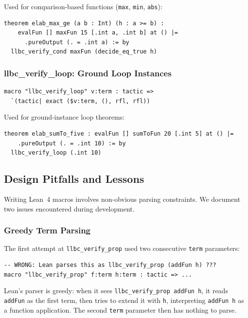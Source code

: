 Used for comparison-based functions (\texttt{max}, \texttt{min}, \texttt{abs}):

\begin{lstlisting}
theorem elab_max_ge (a b : Int) (h : a >= b) :
    evalFun [] maxFun 15 [.int a, .int b] at () |=
      .pureOutput (. = .int a) := by
  llbc_verify_cond maxFun (decide_eq_true h)
\end{lstlisting}

\subsubsection{llbc\_verify\_loop: Ground Loop Instances}

\begin{lstlisting}[caption={llbc\_verify\_loop macro.},label={lst:lvl}]
macro "llbc_verify_loop" v:term : tactic =>
  `(tactic| exact ($v:term, (), rfl, rfl))
\end{lstlisting}

Used for ground-instance loop theorems:

\begin{lstlisting}
theorem elab_sumTo_five : evalFun [] sumToFun 20 [.int 5] at () |=
    .pureOutput (. = .int 10) := by
  llbc_verify_loop (.int 10)
\end{lstlisting}

\subsection{Design Pitfalls and Lessons}

Writing Lean~4 macros involves non-obvious parsing constraints. We document
two issues encountered during development.

\subsubsection{Greedy Term Parsing}

The first attempt at \texttt{llbc\_verify\_prop} used two consecutive
\texttt{term} parameters:

\begin{lstlisting}[caption={Broken macro definition with two term params.},label={lst:broken}]
-- WRONG: Lean parses this as llbc_verify_prop (addFun h) ???
macro "llbc_verify_prop" f:term h:term : tactic => ...
\end{lstlisting}

Lean's parser is greedy: when it sees \texttt{llbc\_verify\_prop addFun h},
it reads \texttt{addFun} as the first term, then tries to extend it with
\texttt{h}, interpreting \texttt{addFun h} as a function application.
The second \texttt{term} parameter then has nothing to parse.

